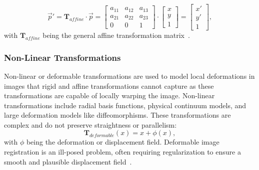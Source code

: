 \documentclass[english,version-2022-01]{uzl-thesis} %
\begin{document}
\begin{equation}
	\overrightarrow{p}' = \mathbf{T}_{affine} \cdot  \overrightarrow{p} = 
	\begin{bmatrix}
		a_{11} & a_{12} & a_{13}\\
		a_{21} & a_{22} & a_{23}\\
		0 & 0 & 1
	\end{bmatrix}
	\cdot
	\begin{bmatrix}
		x\\
		y\\
		1
	\end{bmatrix}
	 = 
	 \begin{bmatrix}
		x'\\
		y'\\
		1
	\end{bmatrix},
\end{equation}
with $\mathbf{T}_{affine}$ being the general affine transformation matrix~\cite{Strittmatter2023}.

\subsubsection{Non-Linear Transformations}
Non-linear or deformable transformations are used to model local deformations in images that rigid and affine transformations cannot capture as these transformations are capable of locally warping the image. Non-linear transformations include radial basis functions, physical continuum models, and large deformation models like diffeomorphisms. These transformations are complex and do not preserve straightness or parallelism:
\begin{equation}
	\mathbf{T}_{deformable} (x) = x + \phi (x),
\end{equation}
with $\phi$ being the deformation or displacement field. Deformable image registration is an ill-posed problem, often requiring regularization to ensure a smooth and plausible displacement field~\cite{Strittmatter2023}.
\end{document}
